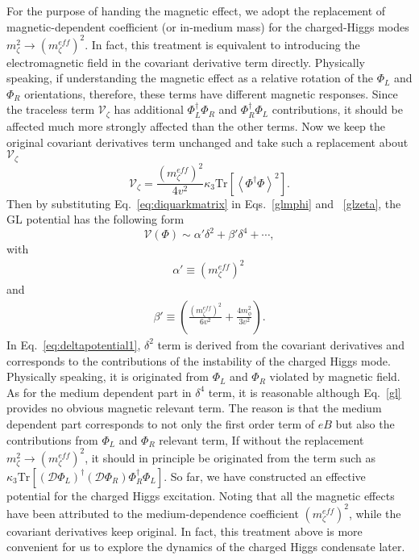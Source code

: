 \documentclass[12pt]{article}
\begin{document}
For the purpose of handing the magnetic effect, we adopt the  replacement of magnetic-dependent coefficient (or in-medium mass) for the charged-Higgs modes
$m_\zeta^2 \rightarrow (m_\zeta^{eff})^2$. 
In fact, this treatment is equivalent to
introducing the electromagnetic field in the covariant derivative term directly.
Physically speaking, if understanding the magnetic
effect as a relative rotation of the $\Phi_L$ and $\Phi_R$ orientations, therefore, these terms have different
magnetic responses. Since the traceless term $\mathcal{V}_\zeta$ has additional $\Phi_L^\dagger\Phi_R$ and  $\Phi_R^\dagger\Phi_L$ contributions, it should be affected much more
 strongly affected than the other terms.
Now we keep the original covariant derivatives term unchanged and take such a replacement about $\mathcal{V}_\zeta$
\begin{equation}
\label{eq:vzeta}
 \mathcal{V}_\zeta=
\frac{(m_\zeta^{eff})^2}{4v^2}\kappa_3\text{Tr}\left[\left<\Phi^\dagger\Phi\right>^2\right].
\end{equation}
Then  by substituting  Eq.~\eqref{eq:diquarkmatrix} in Eqs.~\eqref{glmphi} and ~\eqref{glzeta},
the GL potential  has the following form
\begin{equation}
\label{eq:deltapotential1}
\mathcal{V}(\Phi) \sim  \alpha' \delta^2 + \beta'\delta^4 + \cdots,
\end{equation}
with
\begin{eqnarray}
  \label{eq:coefficients}
\alpha' \equiv (m_\zeta^{eff})^2\,
\end{eqnarray}
and
\begin{eqnarray}
  \label{eq:coefficients2}\beta' \equiv (\frac{(m_\zeta^{eff})^2}{6v^2} + \frac{4 m_\phi^2}{3v^2}).
\end{eqnarray}
In Eq.~\eqref{eq:deltapotential1},  $\delta^2$ term is derived from the covariant derivatives and corresponds to the contributions of the instability of the charged Higgs mode. Physically speaking, it is originated from $\Phi_L$ and $\Phi_R$ violated by magnetic field.
As for the medium dependent part in $\delta^4$ term, it is reasonable although Eq.~\eqref{gl} provides no obvious magnetic relevant term.
The reason is that the medium dependent part corresponds to not only the first order term of $eB$ but also the contributions from $\Phi_L$ and $\Phi_R$ relevant term, If without the replacement $m_\zeta^2 \rightarrow (m_\zeta^{eff})^2$, it  should in principle be originated from  the term such as $\kappa_3\text{Tr}[(\mathcal{D}\Phi_L)^\dagger(\mathcal{D}\Phi_R) \Phi_R^\dagger\Phi_L]$.
So far, we have constructed an effective potential for the charged Higgs excitation. Noting that all the magnetic effects
have been attributed to the medium-dependence coefficient $(m_\zeta^{eff})^2$, while the covariant derivatives keep original.
In fact, this treatment above is more convenient for us to explore the dynamics of the charged Higgs condensate later.
\end{document}
